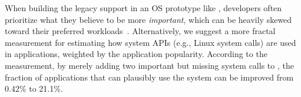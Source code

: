

When building the legacy support in an OS prototype like \graphene{},
developers often prioritize
what they believe to be more \emph{important},
which can be heavily skewed toward their preferred workloads~\cite{tsai16apistudy}.
Alternatively,
we suggest a more fractal measurement
for estimating how system APIs
(e.g., Linux system calls)
are used in applications,
weighted by the application popularity.
According to the measurement,
by merely adding two important but missing system calls to \graphene{},
the fraction of applications that can plausibly use the system
can be improved from 0.42\% to 21.1\%.





